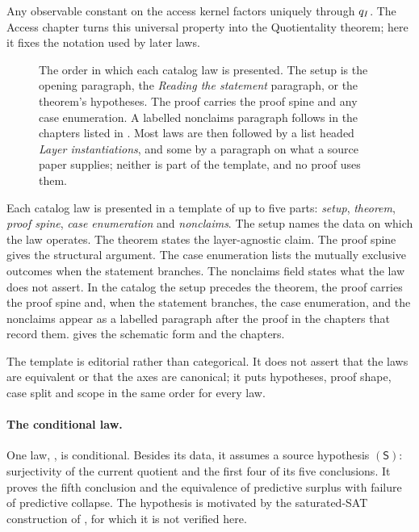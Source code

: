 Any observable constant on the access kernel factors uniquely through
\(q_I\).  The Access chapter turns this universal property into
the Quotientality theorem; here it fixes the notation used by later
laws.

\begin{figure}[t]
\centering
{}
\caption{The order in which each catalog law is presented. The setup is the
opening paragraph, the \emph{Reading the statement} paragraph, or the
theorem's hypotheses. The proof carries the proof spine and any case
enumeration. A labelled nonclaims paragraph follows in the chapters
listed in . Most laws are then followed by a
list headed \emph{Layer instantiations}, and some by a paragraph on what
a source paper supplies; neither is part of the template, and no proof
uses them.}
\label{fig:normal-form-template}
\end{figure}

\begin{definition}\label{def:normal-form}
Each catalog law is presented in a template of up to five parts:
\emph{setup}, \emph{theorem}, \emph{proof spine}, \emph{case
enumeration} and \emph{nonclaims}.  The setup names the data on which
the law operates.  The theorem states the layer-agnostic claim.  The
proof spine gives the structural argument.  The case enumeration lists
the mutually exclusive outcomes when the statement branches.  The
nonclaims field states what the law does not assert.  In the catalog
the setup precedes the theorem, the proof carries the proof spine and,
when the statement branches, the case enumeration, and the nonclaims
appear as a labelled paragraph after the proof in the chapters that
record them.   gives the schematic form
and  the chapters.
\end{definition}

The template is editorial rather than categorical.  It does not assert
that the laws are equivalent or that the axes are canonical; it puts
hypotheses, proof shape, case split and scope in the same order for
every law.

\paragraph{The conditional law.} One law, , is conditional.
Besides its data, it assumes a source hypothesis \((\mathsf S)\):
surjectivity of the current quotient and the first four of its five
conclusions.  It proves the fifth conclusion and the equivalence of
predictive surplus with failure of predictive collapse.  The hypothesis
is motivated by the saturated-SAT construction of
\citet{Tsiokos2026PvNP}, for which it is not verified here.

